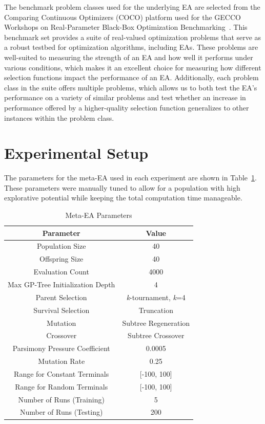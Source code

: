\documentclass[sigconf]{acmart}
\begin{document}
The benchmark problem classes used for the underlying EA are selected from the Comparing Continuous Optimizers (COCO) platform used for the GECCO Workshops on Real-Parameter Black-Box Optimization Benchmarking~\citep{cocobbob}. This benchmark set provides a suite of real-valued optimization problems that serve as a robust testbed for optimization algorithms, including EAs. These problems are well-suited to measuring the strength of an EA and how well it performs under various conditions, which makes it an excellent choice for measuring how different selection functions impact the performance of an EA. Additionally, each problem class in the suite offers multiple problems, which allows us to both test the EA's performance on a variety of similar problems and test whether an increase in performance offered by a higher-quality selection function generalizes to other instances within the problem class.

\section{Experimental Setup}
\label{Primary Experiments}

The parameters for the meta-EA used in each experiment are shown in Table~\ref{tab:Meta-EA Parameters}. These parameters were manually tuned to allow for a population with high explorative potential while keeping the total computation time manageable.

\begin{table}
	\centering
	\caption{Meta-EA Parameters}
	\label{tab:Meta-EA Parameters}
	\begin{tabular}{c|c}
		\toprule
		Parameter& Value\\
		\midrule
		Population Size & 40 \\
		\hline
		Offspring Size & 40\\
		\hline
		Evaluation Count & 4000\\
		\hline
		Max GP-Tree Initialization Depth & 4\\
		\hline
		Parent Selection & \textit{k}-tournament, \textit{k}=4 \\
		\hline
		Survival Selection & Truncation\\
		\hline
		Mutation & Subtree Regeneration\\
		\hline
		Crossover & Subtree Crossover\\
		\hline
		Parsimony Pressure Coefficient & 0.0005\\
		\hline
		Mutation Rate & 0.25\\
		\hline
		Range for Constant Terminals & [-100, 100]\\
		\hline
		Range for Random Terminals & [-100, 100]\\
		\hline
		Number of Runs (Training) & 5 \\
		\hline
		Number of Runs (Testing) & 200\\
		
		\bottomrule
	\end{tabular}
\end{table}
\end{document}

